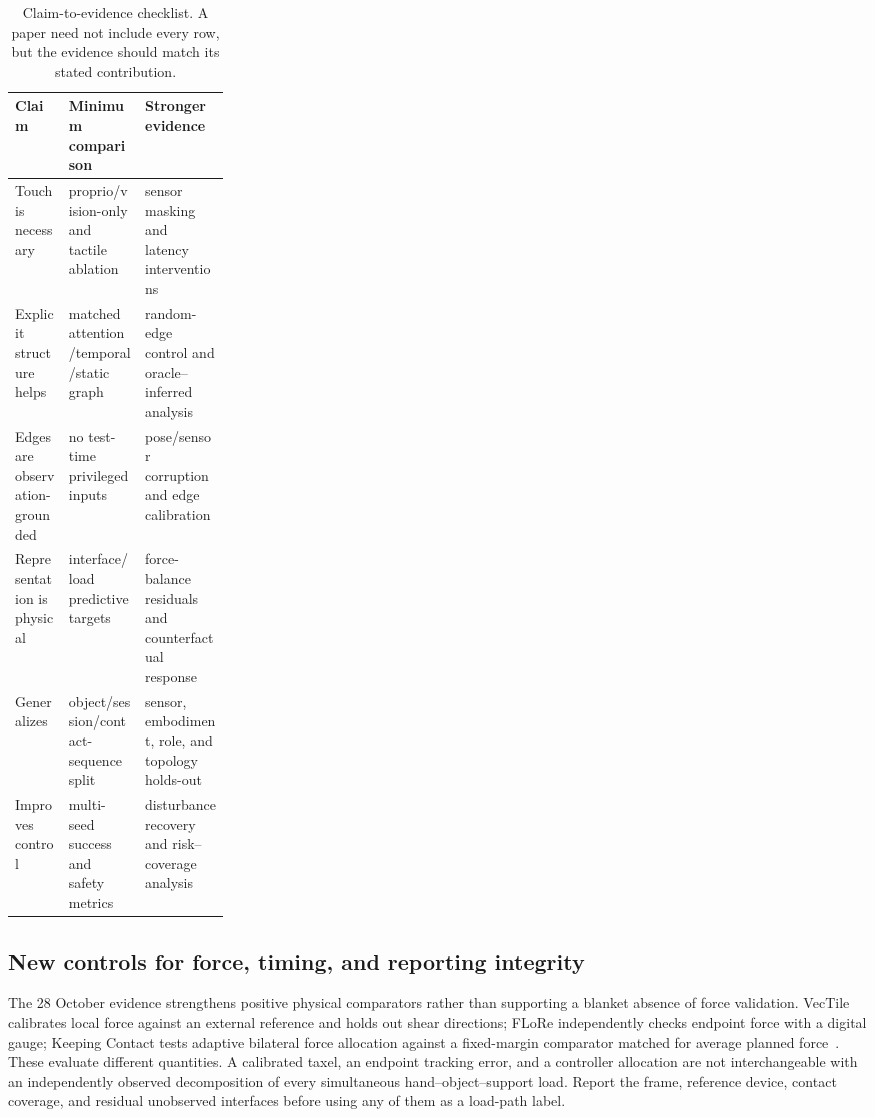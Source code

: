\begin{table}[H]
\centering
\caption{Claim-to-evidence checklist. A paper need not include every row, but the
evidence should match its stated contribution.}
\label{tab:claim_evidence}
\begin{tabularx}{\linewidth}{P{0.25\linewidth} Y Y}
\toprule
\textbf{Claim} & \textbf{Minimum comparison} & \textbf{Stronger evidence} \\
\midrule
Touch is necessary & proprio/vision-only and tactile ablation & sensor masking and latency interventions \\
Explicit structure helps & matched attention/temporal/static graph & random-edge control and oracle--inferred analysis \\
Edges are observation-grounded & no test-time privileged inputs & pose/sensor corruption and edge calibration \\
Representation is physical & interface/load predictive targets & force-balance residuals and counterfactual response \\
Generalizes & object/session/contact-sequence split & sensor, embodiment, role, and topology holds-out \\
Improves control & multi-seed success and safety metrics & disturbance recovery and risk--coverage analysis \\
\bottomrule
\end{tabularx}
\end{table}

\subsection{New controls for force, timing, and reporting integrity}

The 28 October evidence strengthens positive physical comparators rather than
supporting a blanket absence of force validation. VecTile calibrates local force
against an external reference and holds out shear directions; FLoRe independently
checks endpoint force with a digital gauge; Keeping Contact tests adaptive
bilateral force allocation against a fixed-margin comparator matched for average
planned force~\cite{update2026vectile,update2026flore,update2026keepingcontact}.
These evaluate different quantities. A calibrated taxel, an endpoint tracking
error, and a controller allocation are not interchangeable with an independently
observed decomposition of every simultaneous hand--object--support load.
Report the frame, reference device, contact coverage, and residual unobserved
interfaces before using any of them as a load-path label.

